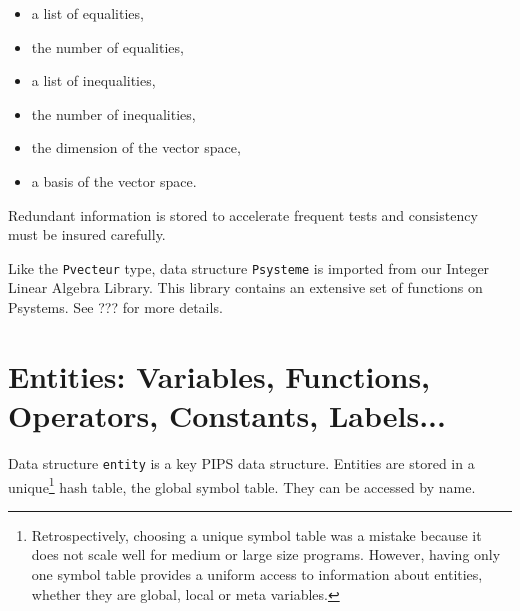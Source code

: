 \begin{itemize}
  \item a list of equalities,
  \item the number of equalities,
  \item a list of inequalities,
  \item the number of inequalities,
  \item the dimension of the vector space,
  \item a basis of the vector space.
\end{itemize}

Redundant information is stored to accelerate frequent tests and
consistency must be insured carefully.

\iffalse
Un Psysteme est forme' de six champs:
\begin{itemize}
  \item une liste d'e'galite's,
  \item le nombre des e'galite's,
  \item une liste d'ine'galite's,
  \item le nombre d'ine'galite's,
  \item la dimension de l'espace de re'fe'rence,
  \item une base de l'espace de re'fe'rence.
\end{itemize}
\fi

Like the {\tt Pvecteur} type, data structure {\tt Psysteme} is imported
from our Integer Linear Algebra Library. This library contains an
extensive set of functions on Psystems. See ??? for more details.

\iffalse
Comme le domaine Pvecteur, la structure de donne'es Psysteme est
importe'e de la bibliothe`que d'alge`bre line'aire en nombres entiers du
CRI.
\fi

\section{Entities: Variables, Functions, Operators, Constants, Labels...}
\label{entity}

Data structure \verb/entity/ is a key PIPS data structure. Entities are
stored in a unique\footnote{Retrospectively, choosing a unique symbol
table was a mistake because it does not scale well for medium or large
size programs. However, having only one symbol table provides a uniform
access to information about entities, whether they are global, local or
meta variables.} hash table, the global symbol table. They can be
accessed by name.


